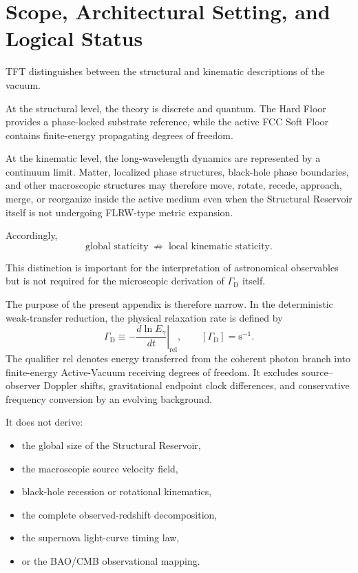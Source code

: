 \section{Scope, Architectural Setting, and Logical Status}

TFT distinguishes between the structural and kinematic descriptions of the
vacuum.

At the structural level, the theory is discrete and quantum. The Hard Floor
provides a phase-locked substrate reference, while the active FCC Soft Floor
contains finite-energy propagating degrees of freedom.

At the kinematic level, the long-wavelength dynamics are represented by a
continuum limit. Matter, localized phase structures, black-hole phase
boundaries, and other macroscopic structures may therefore move, rotate,
recede, approach, merge, or reorganize inside the active medium even when the
Structural Reservoir itself is not undergoing FLRW-type metric expansion.

Accordingly,
\begin{equation}
    \boxed{
    \text{global staticity}
    \;\not\Rightarrow\;
    \text{local kinematic staticity}.
    }
    \label{eq:AQ_global_local_distinction}
\end{equation}

This distinction is important for the interpretation of astronomical
observables but is not required for the microscopic derivation of
$\Gamma_{\mathrm D}$ itself.

The purpose of the present appendix is therefore narrow. In the deterministic
weak-transfer reduction, the physical relaxation rate is defined by
\begin{equation}
    \boxed{
    \Gamma_{\mathrm D}
    \equiv
    -\left.
    \frac{d\ln E_{\gamma}}{dt}
    \right|_{\mathrm{rel}},
    \qquad
    [\Gamma_{\mathrm D}]
    =
    \mathrm{s^{-1}}.
    }
\end{equation}
The qualifier $\mathrm{rel}$ denotes energy transferred from the coherent
photon branch into finite-energy Active-Vacuum receiving degrees of freedom.
It excludes source--observer Doppler shifts, gravitational endpoint clock
differences, and conservative frequency conversion by an evolving background.

It does not derive:

\begin{itemize}
    \item the global size of the Structural Reservoir,
    \item the macroscopic source velocity field,
    \item black-hole recession or rotational kinematics,
    \item the complete observed-redshift decomposition,
    \item the supernova light-curve timing law,
    \item or the BAO/CMB observational mapping.
\end{itemize}

